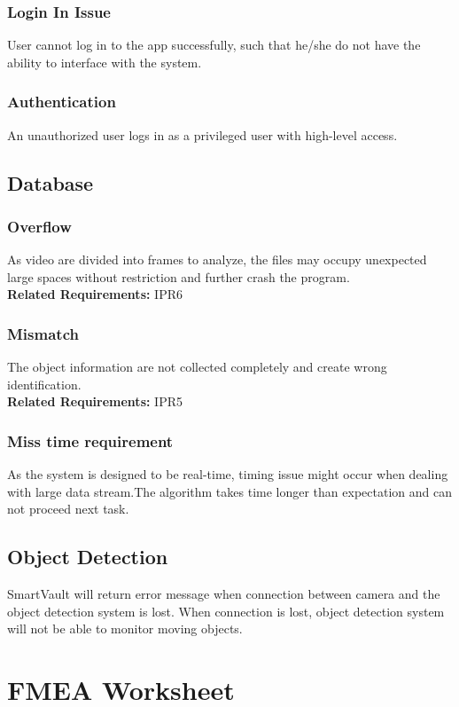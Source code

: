 \documentclass{article}
\begin{document}
\subsubsection{Login In Issue}
User cannot log in to the app successfully, such that he/she do not have the ability to interface with the system.
\subsubsection{Authentication}
An unauthorized user logs in as a privileged user with high-level access.
\subsection{Database}
\subsubsection{Overflow}
As video are divided into frames to analyze, the files may occupy unexpected large spaces without restriction and further crash the program.\\
\textbf{Related Requirements: }IPR6
\subsubsection{Mismatch}
The object information are not collected completely and create wrong identification.\\
\textbf{Related Requirements: }IPR5
\subsubsection{Miss time requirement}
As the system is designed to be real-time, timing issue might occur when dealing with large data stream.The algorithm takes time longer than expectation and can not proceed next task.\\
\subsection{Object Detection}
SmartVault will return error message when connection between camera and the object detection system is lost. When connection is lost, object detection system will not be able to monitor moving objects.


\section{FMEA Worksheet}
\end{document}
